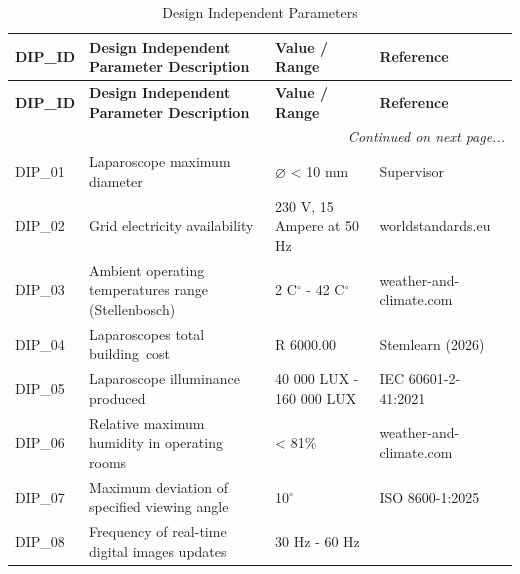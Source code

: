 \begin{longtable}{|p{}|p{}|p{}|p{}|}

\caption{Design Independent Parameters}        
\label{tab:DIP} \\                             

\hline
\textbf{DIP\_ID} & 
\textbf{Design Independent Parameter Description} & 
\textbf{Value / Range} & 
\textbf{Reference} \\
\hline
\endfirsthead

\hline
\textbf{DIP\_ID} & 
\textbf{Design Independent Parameter Description} & 
\textbf{Value / Range} & 
\textbf{Reference} \\
\hline
\endhead

\hline
\multicolumn{4}{r|}{\textit{Continued on next page...}} \\
\hline
\endfoot

\endlastfoot

DIP\_01 & 
Laparoscope maximum \mbox{diameter} & 
$\varnothing$ < 10 mm & 
Supervisor \\
\hline

DIP\_02 & 
Grid electricity availability & 
230 V, 15 Ampere at 50 Hz & 
worldstandards.eu \\
\hline

DIP\_03 & 
Ambient operating temperatures range (Stellenbosch) & 
2 C$^{\circ}$ - 42 C$^{\circ}$ & 
weather-and-climate.com \\
\hline

DIP\_04 & 
Laparoscopes total \mbox{building cost} & 
R 6000.00 & 
Stemlearn (2026) \\
\hline

DIP\_05 & 
Laparoscope illuminance produced & 
40 000 LUX - 160 000 LUX & 
IEC 60601-2-41:2021 \\
\hline

DIP\_06 & 
Relative maximum humidity in operating rooms & 
< 81\% & 
weather-and-climate.com \\
\hline

DIP\_07 & 
Maximum deviation of specified viewing angle & 
10$^{\circ}$ & 
ISO 8600-1:2025 \\
\hline

DIP\_08 & 
Frequency of real-time \mbox{digital} images updates & 
30 Hz - 60 Hz & 
\citep{KSE-TR} \\
\hline

\end{longtable}

